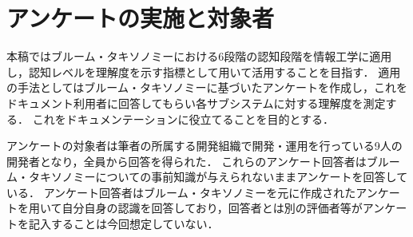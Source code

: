 \section{アンケートの実施と対象者}
本稿ではブルーム・タキソノミーにおける6段階の認知段階を情報工学に適用し，認知レベルを理解度を示す指標として用いて活用することを目指す．
適用の手法としてはブルーム・タキソノミーに基づいたアンケートを作成し，これをドキュメント利用者に回答してもらい各サブシステムに対する理解度を測定する．
これをドキュメンテーションに役立てることを目的とする．

アンケートの対象者は筆者の所属する開発組織で開発・運用を行っている9人の開発者となり，全員から回答を得られた．
これらのアンケート回答者はブルーム・タキソノミーについての事前知識が与えられないままアンケートを回答している．
アンケート回答者はブルーム・タキソノミーを元に作成されたアンケートを用いて自分自身の認識を回答しており，回答者とは別の評価者等がアンケートを記入することは今回想定していない．
